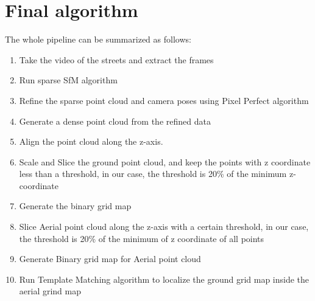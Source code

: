 \documentclass[11pt]{article}
\begin{document}
    \section{Final algorithm}
    The whole pipeline can be summarized as follows:
    \begin{enumerate}
        \item Take the video of the streets and extract the frames
        \item Run sparse SfM algorithm
        \item Refine the sparse point cloud and camera poses using Pixel Perfect algorithm
        \item Generate a dense point cloud from the refined data
        \item Align the point cloud along the z-axis.
        \item Scale and Slice the ground point cloud, and keep the points with z coordinate less than a threshold,
        in our case, the threshold is 20\% of the minimum z-coordinate
        \item Generate the binary grid map
        \item Slice Aerial point cloud along the z-axis with a certain threshold, in our case, the threshold is 20\%
        of the minimum of z coordinate of all points
        \item Generate Binary grid map for Aerial point cloud
        \item Run Template Matching algorithm to localize the ground grid map inside the aerial grind map
    \end{enumerate}
\end{document}
